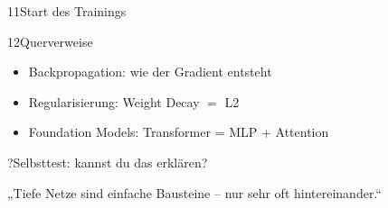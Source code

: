 \begin{hngrid}
\begin{hnp}[raster multicolumn=2,acc=hnpurple]{11}{Start des Trainings}
\begin{itemize}
\end{itemize}
\end{hnp}
%
\begin{hnp}[raster multicolumn=2,acc=hnrose]{12}{Querverweise}
\begin{itemize}
\item Backpropagation: wie der Gradient entsteht
\item Regularisierung: Weight Decay $=$ L2
\item Foundation Models: Transformer = MLP + Attention
\end{itemize}
\end{hnp}
%
\begin{hnp}[raster multicolumn=6,acc=hnpurple,colback=hnlilac!30]{?}{Selbsttest: kannst du das erklären?}
\end{hnp}
%
\begin{hnbanner}[raster multicolumn=6]
„Tiefe Netze sind einfache Bausteine -- nur sehr oft hintereinander.“
\end{hnbanner}
\end{hngrid}
